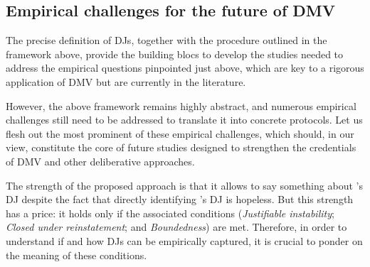 \documentclass[a4paper, 11pt]{article}
\begin{document}

\subsection{Empirical challenges for the future of \ac{DMV}}

The precise definition of \acp{DJ}, together with the procedure outlined in the framework above, provide the building blocs to develop the studies needed to address the empirical questions pinpointed just above, which are key to a rigorous application of \ac{DMV} but are currently  in the literature.


However, the above framework remains highly abstract, and numerous empirical challenges still need to be addressed to translate it into concrete protocols. Let us flesh out the most prominent of these empirical challenges, which should, in our view, constitute the core of future studies designed to strengthen the credentials of \ac{DMV} and other deliberative approaches. 

The strength of the proposed approach is that it allows to say something about \thedm’s \ac{DJ} despite the fact that directly identifying \thedm’s \ac{DJ} is hopeless. 
But this strength has a price: it holds only if the associated conditions (\emph{Justifiable instability}; \emph{Closed under reinstatement}; and \emph{Boundedness}) are met. 
Therefore, in order to understand if and how \acp{DJ} can be empirically captured, it is crucial to ponder on the meaning of these conditions.
\end{document}
